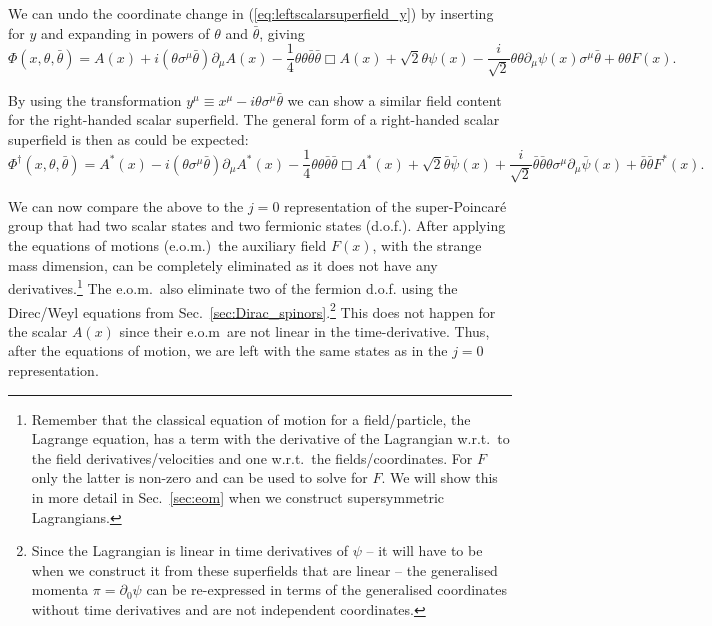 \documentclass[notes.tex]{subfiles}
\begin{document}
We can undo the coordinate change in (\ref{eq:leftscalarsuperfield_y}) by inserting for $y$ and expanding in powers of $\theta$ and $\bar{\theta}$, giving
\begin{equation}
\Phi(x, \theta, \bar{\theta}) = A(x) + i(\theta\sigma^\mu \bar{\theta})\partial_\mu A(x) - \frac{1}{4}\theta\theta\bar{\theta}\bar{\theta}\Box A(x) + \sqrt{2}\theta \psi(x) - \frac{i}{\sqrt{2}}\theta\theta\partial_\mu \psi(x)\sigma^\mu\bar{\theta} + \theta\theta F(x).
\label{eq:leftscalarsuperfield}
\end{equation}

By using the transformation  $y^\mu \equiv x^\mu - i\theta\sigma^\mu \bar{\theta}$ we can show a similar field content for the right-handed scalar superfield. The general form of a right-handed scalar superfield is then as could be expected:
\begin{equation}
\Phi^\dagger (x, \theta, \bar{\theta}) = A^*(x) - i(\theta\sigma^\mu \bar{\theta})\partial_\mu A^*(x) - \frac{1}{4}\theta\theta\bar{\theta}\bar{\theta}\Box A^*(x) + \sqrt{2}\bar{\theta}\bar{\psi}(x) + \frac{i}{\sqrt{2}}\bar{\theta}\bar{\theta}\theta \sigma^\mu\partial_\mu \bar{\psi}(x) +\bar{\theta}\bar{\theta} F^*(x).
\label{eq:rightscalarsuperfield}
\end{equation}

We can now compare the above to the $j=0$ representation of the super-Poincaré group that had two scalar states and two fermionic states (d.o.f.).  After applying the equations of motions (e.o.m.)\ the auxiliary field $F(x)$, with the strange mass dimension, can be completely eliminated as it does not have any derivatives.\footnote{Remember that the classical equation of motion for a field/particle, the Lagrange equation, has a term with the derivative of the Lagrangian w.r.t.\ to the field derivatives/velocities and one w.r.t.\ the fields/coordinates. For $F$ only the latter is non-zero and can be used to solve for $F$. We will show this in more detail in Sec.~\ref{sec:eom} when we construct supersymmetric Lagrangians.} The e.o.m.\ also eliminate two of the fermion d.o.f. using the Direc/Weyl equations from Sec.~\ref{sec:Dirac_spinors}.\footnote{Since the Lagrangian is linear in time derivatives of $\psi$ -- it will have to be  when we construct it from these superfields that are linear -- the generalised momenta $\pi=\partial_0\psi$ can be re-expressed in terms of the generalised coordinates without time derivatives and are not independent coordinates.} 
This does not happen for the scalar $A(x)$ since their e.o.m\ are not linear in the time-derivative. Thus, after the equations of motion, we are left with the same states as in the $j=0$ representation.
\end{document}

